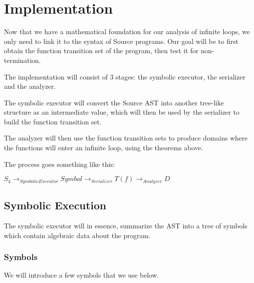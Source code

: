 \section{Implementation}

Now that we have a mathematical foundation for our analysis of infinite loops, we only need to link it to the syntax of Source programs.
Our goal will be to first obtain the function transition set of the program, then test it for non-termination.

The implementation will consist of 3 stages: the symbolic executor, the serializer and the analyzer.

The symbolic executor will convert the Source AST into another tree-like structure as an intermediate value, which will then be used by the serializer to build the function transition set.

The analyzer will then use the function transition sets to produce domains where the functions will enter an infinite loop, using the theorems above.

The process goes something like this:

$S_4 \to_{Symbolic Executor} Symbol \to_{Serializer} T(f) \to_{Analyzer} D $


\subsection{Symbolic Execution}

The symbolic executor will in essence, summarize the AST into a tree of symbols which contain algebraic data about the program.

\subsubsection{Symbols}
We will introduce a few symbols that we use below.

